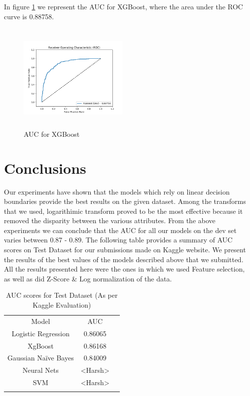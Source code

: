 \documentclass[conference]{IEEEtran}
\numberwithin{equation}{section}
\numberwithin{figure}{section}
\numberwithin{table}{section}
\begin{document}
In figure \ref{xgboost_fig} we represent the AUC for XGBoost, where the area under the ROC curve is 0.88758.
 
\begin{figure}
\centering
  \includegraphics[width=200px, height = 200px]{xgboost_dev}
  \caption{AUC for XGBoost}
  \label{xgboost_fig}
\end{figure}

\section{Conclusions}
Our experiments have shown that the models which rely on linear decision boundaries provide the best results on the given dataset. Among the transforms that we used, logarithimic transform proved to be the most effective because it removed the disparity between the various attributes. From the above experiments we can conclude that the AUC for all our models on the dev set varies between 0.87 - 0.89.
The following table provides a summary of AUC scores on Test Dataset for our submissions made on Kaggle website. We present the results of the best values of the models described above that we submitted. All the results presented here were the ones in which we used Feature selection, as well as did Z-Score \& Log normalization of the data.
\begin{table}[!htb]
\centering
\caption{AUC scores for Test Dataset (As per Kaggle Evaluation)}
\label{tab_lr}
\begin{tabular}{ c c c }
 \noalign{\smallskip}\hline\noalign{\smallskip}
   Model  & AUC \\
 \noalign{\smallskip}\hline\noalign{\smallskip}
 Logistic Regression & 0.86065\\
 XgBoost & 0.86168\\
 Gaussian Na{\"i}ve Bayes & 0.84009\\
 Neural Nets & <Harsh>\\
 SVM & <Harsh> \\
 		\noalign{\smallskip}\hline\noalign{\smallskip}	
 \end{tabular}
\end{table}
\end{document}

